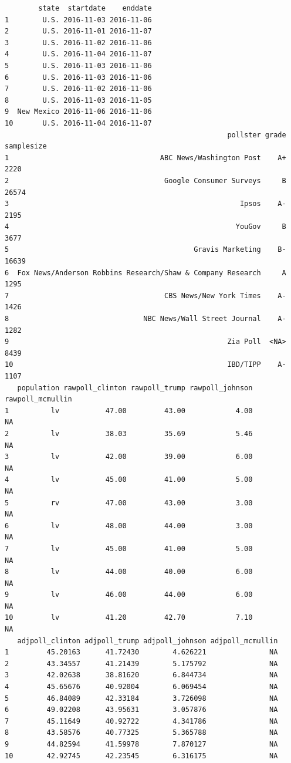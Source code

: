 \documentclass[
  letterpaper,
  DIV=11,
  numbers=noendperiod]{scrartcl}
\begin{document}
\begin{verbatim}
        state  startdate    enddate
1        U.S. 2016-11-03 2016-11-06
2        U.S. 2016-11-01 2016-11-07
3        U.S. 2016-11-02 2016-11-06
4        U.S. 2016-11-04 2016-11-07
5        U.S. 2016-11-03 2016-11-06
6        U.S. 2016-11-03 2016-11-06
7        U.S. 2016-11-02 2016-11-06
8        U.S. 2016-11-03 2016-11-05
9  New Mexico 2016-11-06 2016-11-06
10       U.S. 2016-11-04 2016-11-07
                                                     pollster grade samplesize
1                                    ABC News/Washington Post    A+       2220
2                                     Google Consumer Surveys     B      26574
3                                                       Ipsos    A-       2195
4                                                      YouGov     B       3677
5                                            Gravis Marketing    B-      16639
6  Fox News/Anderson Robbins Research/Shaw & Company Research     A       1295
7                                     CBS News/New York Times    A-       1426
8                                NBC News/Wall Street Journal    A-       1282
9                                                    Zia Poll  <NA>       8439
10                                                   IBD/TIPP    A-       1107
   population rawpoll_clinton rawpoll_trump rawpoll_johnson rawpoll_mcmullin
1          lv           47.00         43.00            4.00               NA
2          lv           38.03         35.69            5.46               NA
3          lv           42.00         39.00            6.00               NA
4          lv           45.00         41.00            5.00               NA
5          rv           47.00         43.00            3.00               NA
6          lv           48.00         44.00            3.00               NA
7          lv           45.00         41.00            5.00               NA
8          lv           44.00         40.00            6.00               NA
9          lv           46.00         44.00            6.00               NA
10         lv           41.20         42.70            7.10               NA
   adjpoll_clinton adjpoll_trump adjpoll_johnson adjpoll_mcmullin
1         45.20163      41.72430        4.626221               NA
2         43.34557      41.21439        5.175792               NA
3         42.02638      38.81620        6.844734               NA
4         45.65676      40.92004        6.069454               NA
5         46.84089      42.33184        3.726098               NA
6         49.02208      43.95631        3.057876               NA
7         45.11649      40.92722        4.341786               NA
8         43.58576      40.77325        5.365788               NA
9         44.82594      41.59978        7.870127               NA
10        42.92745      42.23545        6.316175               NA
\end{verbatim}
\end{document}
